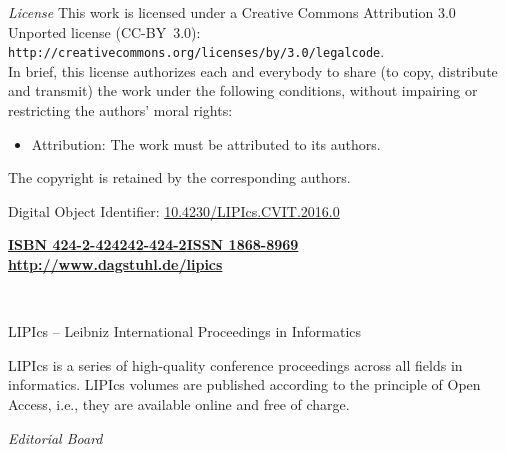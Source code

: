 \documentclass[a4paper,UKenglish]{lipicsmaster-v2018}
\newcommand{\VolumeISBN}{424-2-424242-424-2}
\begin{document}
\begin{publicationinfo}
\bigskip

\emph{License}\newline
This work is licensed under a Creative Commons Attribution 3.0 Unported license (CC-BY~3.0): \texttt{http://creativecommons.org/licenses/by/3.0/legalcode}.\\
In brief, this license authorizes each and everybody to share (to copy, distribute and transmit) the work under the following conditions, without impairing or restricting the authors' moral rights:
\begin{itemize}
\item Attribution: The work must be attributed to its authors.
\end{itemize}

\smallskip

The copyright is retained by the corresponding authors.

\bigskip
\bigskip
\bigskip
\bigskip

Digital Object Identifier: \href{http://dx.doi.org/10.4230/LIPIcs.CVIT.2016.0}{10.4230/LIPIcs.CVIT.2016.0}

\vfill
\textbf{\href{http://www.dagstuhl.de/dagpub/\VolumeISBN}{ISBN \VolumeISBN}}\qquad \qquad \textbf{\href{http://drops.dagstuhl.de/lipics}{ISSN 1868-8969}}  \hfill \textbf{\href{http://www.dagstuhl.de/lipics}{http://www.dagstuhl.de/lipics}}

  
\newpage

\ \\
\bigskip
\bigskip
\bigskip

{\Large LIPIcs -- Leibniz International Proceedings in Informatics}
 
\bigskip
 
LIPIcs is a series of high-quality conference proceedings across all fields in informatics. 
LIPIcs volumes are published according to the principle of Open Access, i.e., they are available online and free of charge. 
 
\bigskip
\bigskip
\bigskip
 
\emph{Editorial Board}


\end{publicationinfo}
\end{document}
